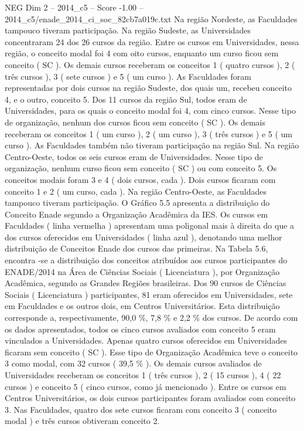 \begin{textsample}{NEG Dim 2 – 2014\_c5 – Score -1.00 – 2014\_c5/enade\_2014\_ci\_soc\_82cb7a019c.txt}
Na região Nordeste, as Faculdades tampouco tiveram participação.
Na região Sudeste, as Universidades concentraram 24 dos 26 cursos da região.
Entre os cursos em Universidades, nessa região, o conceito modal foi 4 com oito cursos, enquanto um curso ficou sem conceito ( SC ).
Os demais cursos receberam os conceitos 1 ( quatro cursos ), 2 ( três cursos ), 3 ( sete cursos ) e 5 ( um curso ).
As Faculdades foram representadas por dois cursos na região Sudeste, dos quais um, recebeu conceito 4, e o outro, conceito 5.
Dos 11 cursos da região Sul, todos eram de Universidades, para os quais o conceito modal foi 4, com cinco cursos.
Nesse tipo de organização, nenhum dos cursos ficou sem conceito ( SC ).
Os demais receberam os conceitos 1 ( um curso ), 2 ( um curso ), 3 ( três cursos ) e 5 ( um curso ).
As Faculdades também não tiveram participação na região Sul.
Na região Centro-Oeste, todos os seis cursos eram de Universidades.
Nesse tipo de organização, nenhum curso ficou sem conceito ( SC ) ou com conceito 5.
Os conceitos modais foram 3 e 4 ( dois cursos, cada ).
Dois cursos ficaram com conceito 1 e 2 ( um curso, cada ).
Na região Centro-Oeste, as Faculdades tampouco tiveram participação.
O Gráfico 5.5 apresenta a distribuição do Conceito Enade segundo a Organização Acadêmica da IES.
Os cursos em Faculdades ( linha vermelha ) apresentam uma poligonal mais à direita do que a dos cursos oferecidos em Universidades ( linha azul ), denotando uma melhor distribuição de Conceitos Enade dos cursos das primeiras.
Na Tabela 5.6, encontra -se a distribuição dos conceitos atribuídos aos cursos participantes do ENADE/2014 na Área de Ciências Sociais ( Licenciatura ), por Organização Acadêmica, segundo as Grandes Regiões brasileiras.
Dos 90 cursos de Ciências Sociais ( Licenciatura ) participantes, 81 eram oferecidos em Universidades, sete em Faculdades e os outros dois, em Centros Universitários.
Esta distribuição corresponde a, respectivamente, 90,0 \%, 7,8 \% e 2,2 \% dos cursos.
De acordo com os dados apresentados, todos os cinco cursos avaliados com conceito 5 eram vinculados a Universidades.
Apenas quatro cursos oferecidos em Universidades ficaram sem conceito ( SC ).
Esse tipo de Organização Acadêmica teve o conceito 3 como modal, com 32 cursos ( 39,5 \% ).
Os demais cursos avaliados de Universidades receberam os conceitos 1 ( três cursos ), 2 ( 15 cursos ), 4 ( 22 cursos ) e conceito 5 ( cinco cursos, como já mencionado ).
Entre os cursos em Centros Universitários, os dois cursos participantes foram avaliados com conceito 3.
Nas Faculdades, quatro dos sete cursos ficaram com conceito 3 ( conceito modal ) e três cursos obtiveram conceito 2.

\end{textsample}
